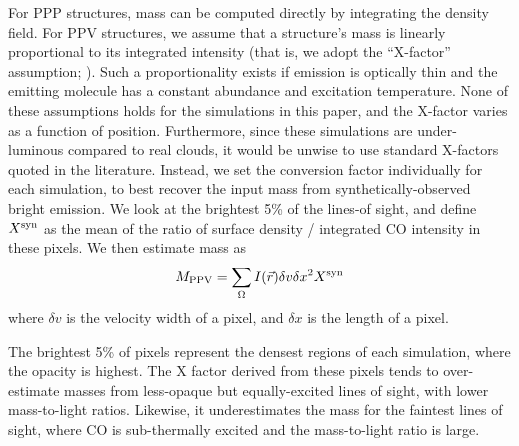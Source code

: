 {For PPP structures, mass can be computed directly by integrating the density field. For PPV structures, we assume that a structure's mass is linearly proportional
to its integrated intensity (that is, we adopt the ``X-factor'' assumption; \citealt{http://adsabs.harvard.edu/abs/2008ApJ...679..481P}).
Such a proportionality exists if emission is optically thin and the emitting molecule has a constant abundance and excitation temperature. None of these assumptions holds for the simulations in this paper, and the X-factor varies as a function of position. Furthermore, since these simulations are under-luminous compared to real clouds, it would be unwise to use standard X-factors quoted in the literature. Instead, we set the conversion factor individually for each simulation, to best recover the input mass from synthetically-observed bright emission. We look at the brightest 5\% of the lines-of sight, and define $X^{\rm syn}$ as the mean of the ratio of surface density / integrated CO intensity in these pixels. We then estimate mass as
\begin{equation}
M_{\rm PPV} = \sum_{\Omega} I(\vec{r}) \delta v \delta x^2 X^{\rm syn}
\label{eq:xfactor_mass}
\end{equation}
where $\delta v$ is the velocity width of a pixel, and $\delta x$ is the length of a pixel.

The brightest 5\% of pixels represent the densest regions of each simulation, where the opacity is highest. The X factor derived from these pixels tends to over-estimate masses from less-opaque but equally-excited lines of sight, with lower mass-to-light ratios. Likewise, it underestimates the mass for the faintest lines of sight, where CO is sub-thermally excited and the mass-to-light ratio is large.
}
